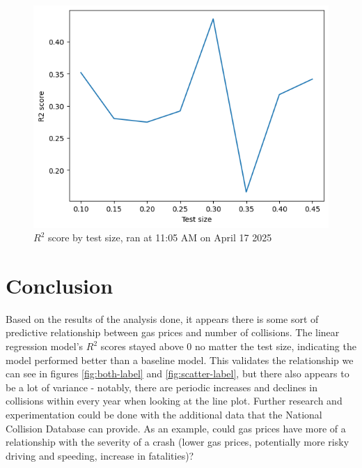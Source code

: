 \documentclass[runningheads]{llncs}
\begin{document}
\begin{figure}
    \centering
    \includegraphics[scale=0.75]{LinRegChart1105Apr17.png}   
    \caption{\(R^2\) score by test size, ran at 11:05 AM on April 17 2025}
    \label{fig:r2-label-2}
\end{figure}

\section{Conclusion}
Based on the results of the analysis done, it appears there is some sort of predictive relationship between gas prices and number of collisions. The linear regression model's \(R^2\) scores stayed above 0 no matter the test size, indicating the model performed better than a baseline model. This validates the relationship we can see in figures \ref{fig:both-label} and \ref{fig:scatter-label}, but there also appears to be a lot of variance - notably, there are periodic increases and declines in collisions within every year when looking at the line plot. Further research and experimentation could be done with the additional data that the National Collision Database\cite{ref_url1} can provide. As an example, could gas prices have more of a relationship with the severity of a crash (lower gas prices, potentially more risky driving and speeding, increase in fatalities)? 
\end{document}

